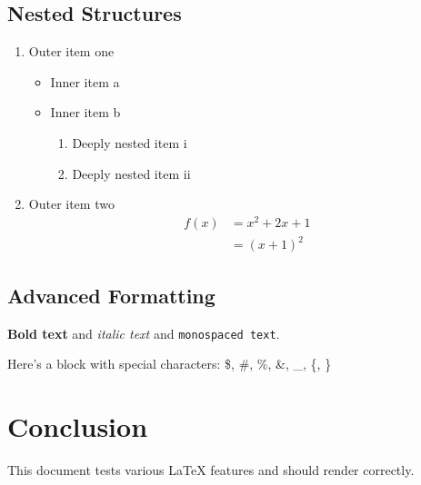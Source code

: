 \documentclass{article}
\begin{document}
\subsection{Nested Structures}

\begin{enumerate}
    \item Outer item one
    \begin{itemize}
        \item Inner item a
        \item Inner item b
        \begin{enumerate}
            \item Deeply nested item i
            \item Deeply nested item ii
        \end{enumerate}
    \end{itemize}
    \item Outer item two
    \begin{align*}
        f(x) &= x^2 + 2x + 1 \\
        &= (x+1)^2
    \end{align*}
\end{enumerate}

\subsection{Advanced Formatting}

\textbf{Bold text} and \textit{italic text} and \texttt{monospaced text}.

Here's a block with special characters: \$, \#, \%, \&, \_, \{, \}

\section{Conclusion}

This document tests various LaTeX features and should render correctly.
\end{document}
